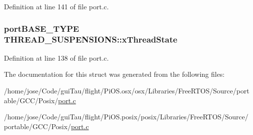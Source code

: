 Definition at line 141 of file port.\-c.

\hypertarget{struct_t_h_r_e_a_d___s_u_s_p_e_n_s_i_o_n_s_a0cf3b432cb0b0a6efd2bf38e656b6978}{
\subsubsection[{x\-Thread\-State}]{\setlength{\rightskip}{0pt plus 5cm}port\-B\-A\-S\-E\-\_\-\-T\-Y\-P\-E T\-H\-R\-E\-A\-D\-\_\-\-S\-U\-S\-P\-E\-N\-S\-I\-O\-N\-S\-::x\-Thread\-State}}\label{struct_t_h_r_e_a_d___s_u_s_p_e_n_s_i_o_n_s_a0cf3b432cb0b0a6efd2bf38e656b6978}


Definition at line 138 of file port.\-c.



The documentation for this struct was generated from the following files\-:\begin{DoxyCompactItemize}
\item 
/home/jose/\-Code/gui\-Tau/flight/\-Pi\-O\-S.\-osx/osx/\-Libraries/\-Free\-R\-T\-O\-S/\-Source/portable/\-G\-C\-C/\-Posix/\hyperlink{osx_2osx_2_libraries_2_free_r_t_o_s_2_source_2portable_2_g_c_c_2_posix_2port_8c}{port.\-c}\item 
/home/jose/\-Code/gui\-Tau/flight/\-Pi\-O\-S.\-posix/posix/\-Libraries/\-Free\-R\-T\-O\-S/\-Source/portable/\-G\-C\-C/\-Posix/\hyperlink{posix_2posix_2_libraries_2_free_r_t_o_s_2_source_2portable_2_g_c_c_2_posix_2port_8c}{port.\-c}\end{DoxyCompactItemize}
